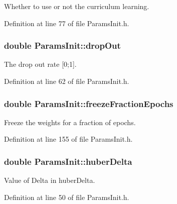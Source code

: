 Whether to use or not the curriculum learning. 



Definition at line 77 of file Params\+Init.\+h.

\subsubsection[{\texorpdfstring{drop\+Out}{dropOut}}]{\setlength{\rightskip}{0pt plus 5cm}double Params\+Init\+::drop\+Out}\hypertarget{classParamsInit_aa76f649c6aa95c27f13bc382d3ea46b7}{}\label{classParamsInit_aa76f649c6aa95c27f13bc382d3ea46b7}


The drop out rate \mbox{[}0;1\mbox{]}. 



Definition at line 62 of file Params\+Init.\+h.

\subsubsection[{\texorpdfstring{freeze\+Fraction\+Epochs}{freezeFractionEpochs}}]{\setlength{\rightskip}{0pt plus 5cm}double Params\+Init\+::freeze\+Fraction\+Epochs}\hypertarget{classParamsInit_a57741539dedc3c7d0ca48096076e12f2}{}\label{classParamsInit_a57741539dedc3c7d0ca48096076e12f2}


Freeze the weights for a fraction of epochs. 



Definition at line 155 of file Params\+Init.\+h.

\subsubsection[{\texorpdfstring{huber\+Delta}{huberDelta}}]{\setlength{\rightskip}{0pt plus 5cm}double Params\+Init\+::huber\+Delta}\hypertarget{classParamsInit_a587ab88af68e6f229c8c10642fafd455}{}\label{classParamsInit_a587ab88af68e6f229c8c10642fafd455}


Value of Delta in huber\+Delta. 



Definition at line 50 of file Params\+Init.\+h.

